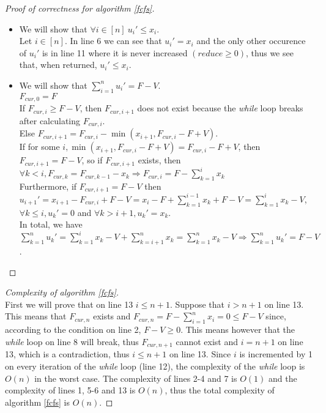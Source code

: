 \documentclass[11pt]{article}
\theoremstyle{definition}
\theoremstyle{corollary}
\theoremstyle{lemma}
\begin{document}
    \begin{proof}[Proof of correctness for algorithm \ref{fcfs}] \
       \begin{itemize}
          \item We will show that $\forall i \in [n] \: u_i' \leq x_i$. \\
          Let $i \in [n]$. In line 6 we can see that $u_i' = x_i$ and the only other occurence of $u_i'$
          is in line 11 where it is never increased $(reduce \geq 0)$, thus we see that, when returned, $u_i' \leq x_i$.
          \item We will show that $\sum\limits_{i=1}^{n}u_i' = F - V$. \\
          $F_{cur,0} = F$ \\
          If $F_{cur,i} \geq F - V$, then $F_{cur,i+1}$ does not exist because the \emph{while} loop breaks after calculating
          $F_{cur,i}$. \\
          Else $F_{cur,i+1} = F_{cur,i} - \min{(x_{i+1}, F_{cur,i} - F + V)}$. \\
          If for some $i, \min{(x_{i+1}, F_{cur,i} - F + V)} = F_{cur,i} - F + V$, then $F_{cur,i+1} = F - V$, so if
          $F_{cur,i+1}$ exists, then $\forall k < i, F_{cur,k} = F_{cur,k-1} - x_k \Rightarrow F_{cur,i} =
          F - \sum\limits_{k=1}^{i}x_k$ \\
          Furthermore, if $F_{cur,i+1} = F - V$ then $u_{i+1}' = x_{i+1} - F_{cur,i} + F - V =
          x_i - F + \sum\limits_{k=1}^{i-1}x_k + F - V = \sum\limits_{k=1}^{i}x_k - V$, $\forall k \leq i, u_k' = 0$
          and $\forall k > i+1, u_k' = x_k$. \\
          In total, we have $\sum\limits_{k=1}^{n}u_k' = \sum\limits_{k=1}^{i}x_k - V + \sum\limits_{k=i+1}^{n}x_k =
          \sum\limits_{k=1}^{n}x_k - V \Rightarrow \sum\limits_{k=1}^{n}u_k' = F - V$.
       \end{itemize}
    \end{proof}
    \begin{proof}[Complexity of algorithm \ref{fcfs}] \ \\
       First we will prove that on line 13 $i \leq n+1$. Suppose that $i > n+1$ on line 13. This means that $F_{cur,n}$
       exists and $F_{cur,n} = F - \sum\limits_{i=1}^{n}x_i = 0 \leq F - V$ since, according to the condition on line 2,
       $F - V \geq 0$. This means however that the \emph{while} loop on line 8 will break, thus $F_{cur,n+1}$ cannot exist
       and $i = n + 1$ on line 13, which is a contradiction, thus $i \leq n+1$ on line 13. Since $i$ is incremented by 1
       on every iteration of the \emph{while} loop (line 12), the complexity of the \emph{while} loop is $O(n)$ in the
       worst case. The complexity of lines 2-4 and 7 is $O(1)$ and the complexity of lines 1, 5-6 and 13 is $O(n)$, thus
       the total complexity of algorithm \ref{fcfs} is $O(n)$.
    \end{proof}
\end{document}
